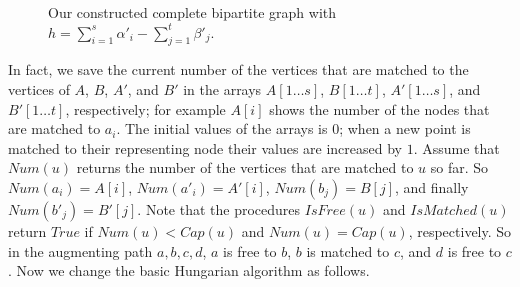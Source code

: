 \documentclass[preprint,12pt]{elsarticle}
\begin{document}
\begin{figure}
\vspace{-8cm}
\hspace{-11cm}
\vspace{-37.5cm}
\caption{Our constructed complete bipartite graph with $h=\sum_{i=1}^s{\alpha}'_i-\sum_{j=1}^t{\beta}'_j$.}
\label{fig:1}       \end{figure}


In fact, we save the current number of the vertices that are matched to the vertices of $A$, $B$, $A'$, and $B'$ in the arrays $A[1 \dots s]$, $B[1 \dots t]$, $A'[1 \dots s]$, and $B'[1 \dots t]$, respectively; for example $A[i]$ shows the number of the nodes that are matched to $a_i$. The initial values of the arrays is $0$; when a new point is matched to their representing node their values are increased by $1$. Assume that $Num(u)$ returns the number of the vertices that are matched to $u$ so far. So $Num(a_i)=A[i]$, $Num(a'_i)=A'[i]$, $Num(b_j)=B[j]$, and finally $Num(b'_j)=B'[j]$. Note that the procedures $IsFree(u)$ and $IsMatched(u)$ return $True$ if $Num(u)<Cap(u)$ and $Num(u)=Cap(u)$, respectively. So in the augmenting path $a,b,c,d$, $a$ is free to $b$, $b$ is matched to $c$, and $d$ is free to $c$. Now we change the basic Hungarian algorithm as follows.


\end{document}
